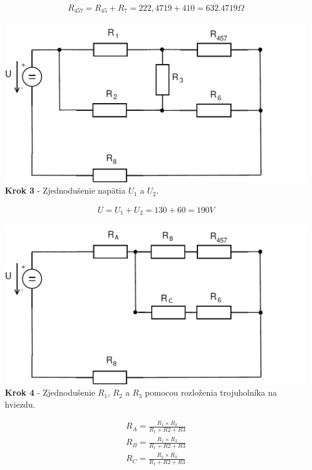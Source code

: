 \begin{gather*}
R_{457}=R_{45}+R_{7}=222,4719+410=632.4719\Omega 
\end{gather*}


\begin{center}
\includegraphics[scale=0.5,keepaspectratio]{fig/obr/Pr1_3.png} \\
\textbf{Krok 3} - Zjednodušenie napätia $U_{1}$ a $U_{2}$.
\end{center}

\begin{gather*}
U=U_{1}+U_{2}=130+60=190V 
\end{gather*}


\begin{center}
\includegraphics[scale=0.5,keepaspectratio]{fig/obr/Pr1_4.png} \\
\textbf{Krok 4} - Zjednodušenie  $R_{1}$, $R_{2}$ a  $R_{3}$ pomocou rozloženia trojuholníka na hviezdu.
\end{center}

\begin{gather*}
R_{A}=\frac{R_{1} \times R_{2}}{R_{1}+R{2}+R{3}}\\
R_{B}=\frac{R_{1} \times R_{3}}{R_{1}+R{2}+R{3}}\\
R_{C}=\frac{R_{2} \times R_{3}}{R_{1}+R{2}+R{3}}\\
\end{gather*}


